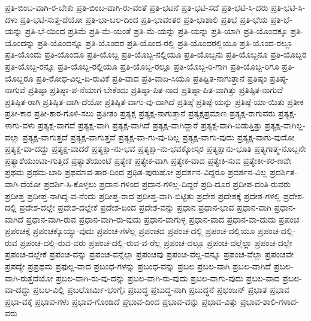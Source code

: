 {ಪ್ರತಿ-ಬಿಂಬ-ವಾಗಿ-ರ-ಬೇಕು
ಪ್ರತಿ-ಬಿಂಬ-ವಾಗಿ-ರು-ವಂತೆ
ಪ್ರತಿ-ಭಟನೆ
ಪ್ರತಿ-ಭಟಿ-ಸದೆ
ಪ್ರತಿ-ಭಟಿ-ಸಿ-ದರು
ಪ್ರತಿ-ಭಟಿ-ಸಿ-ದಳು
ಪ್ರತಿ-ಭಟಿ-ಸುತ್ತ-ದೆಯೋ
ಪ್ರತಿ-ಭಾ-ಬಲ-ದಿಂದ
ಪ್ರತಿ-ಭಾವಂತರ
ಪ್ರತಿ-ಭಾಶಾಲಿ
ಪ್ರತಿಭೆ
ಪ್ರತಿ-ಭೆಯ
ಪ್ರತಿ-ಭೆ-ಯನ್ನು
ಪ್ರತಿ-ಭೆ-ಯಿಂದ
ಪ್ರತಿಮೆ
ಪ್ರತಿ-ಮೆ-ಯಂತೆ
ಪ್ರತಿ-ಮೆ-ಯನ್ನು
ಪ್ರತಿ-ಯನ್ನು
ಪ್ರತಿ-ಯಾಗಿ
ಪ್ರತಿ-ಯೊಂದಕ್ಕೂ
ಪ್ರತಿ-ಯೊಂದನ್ನು
ಪ್ರತಿ-ಯೊಂದನ್ನೂ
ಪ್ರತಿ-ಯೊಂದರ
ಪ್ರತಿ-ಯೊಂದ-ರಲ್ಲಿ
ಪ್ರತಿ-ಯೊಂದರಲ್ಲಿಯೂ
ಪ್ರತಿ-ಯೊಂದ-ರಲ್ಲೂ
ಪ್ರತಿ-ಯೊಂದು
ಪ್ರತಿ-ಯೊಂದೂ
ಪ್ರತಿ-ಯೊಬ್ಬ
ಪ್ರತಿ-ಯೊಬ್ಬ-ನಲ್ಲಿಯೂ
ಪ್ರತಿ-ಯೊಬ್ಬನು
ಪ್ರತಿ-ಯೊಬ್ಬನೂ
ಪ್ರತಿ-ಯೊಬ್ಬರ
ಪ್ರತಿ-ಯೊಬ್ಬ-ರನ್ನೂ
ಪ್ರತಿ-ಯೊಬ್ಬ-ರಲ್ಲಿಯೂ
ಪ್ರತಿ-ಯೊಬ್ಬ-ರಲ್ಲೂ
ಪ್ರತಿ-ಯೊಬ್ಬ-ರಿ-ಗಾಗಿ
ಪ್ರತಿ-ಯೊಬ್ಬ-ರಿಗೂ
ಪ್ರತಿ-ಯೊಬ್ಬರೂ
ಪ್ರತಿ-ರೋಧ-ವಿಲ್ಲ-ದಿ-ರುವಿಕೆ
ಪ್ರತಿ-ವಾದ
ಪ್ರತಿ-ವಾದಿ-ಸಿಯೂ
ಪ್ರತಿಷ್ಟಿತ-ನಾಗುತ್ತಾನೆ
ಪ್ರತಿಷ್ಠಂ
ಪ್ರತಿಷ್ಠ-ನಾಗುವೆ
ಪ್ರತಿಷ್ಠಾ
ಪ್ರತಿಷ್ಠಾ-ಪ-ನೆಯಾಗ-ಬೇಕೆಂದು
ಪ್ರತಿಷ್ಠಾ-ಪಿತ-ನಾದ
ಪ್ರತಿಷ್ಠಾ-ಪಿತ-ವಾಗಿತ್ತು
ಪ್ರತಿಷ್ಠಿತ-ನಾಗುವೆ
ಪ್ರತಿಷ್ಠಿತ-ರಾಗಿ
ಪ್ರತಿಷ್ಠಿತ-ವಾಗಿ-ದೆಯೋ
ಪ್ರತಿಷ್ಠಿತ-ವಾಗು-ವು-ದಾಗಿದೆ
ಪ್ರತಿಷ್ಠೆ
ಪ್ರತಿಷ್ಠೆ-ಯನ್ನು
ಪ್ರತಿಷ್ಠೆ-ಯಾ-ಯಿತು
ಪ್ರತೀಕ
ಪ್ರತೀ-ಕಾರ
ಪ್ರತೀ-ಕಾರ-ಗೊಳಿ-ಸಲು
ಪ್ರತೀತಂ
ಪ್ರತ್ಯಕ್ಷ
ಪ್ರತ್ಯಕ್ಷ-ನಾಗುತ್ತಾನೆ
ಪ್ರತ್ಯಕ್ಷಪ್ರಮಾಣ
ಪ್ರತ್ಯಕ್ಷ-ರಾಗುವರು
ಪ್ರತ್ಯಕ್ಷ-ಳಾಗು-ವಳು
ಪ್ರತ್ಯಕ್ಷ-ವಾಗದೆ
ಪ್ರತ್ಯಕ್ಷ-ವಾಗಿ
ಪ್ರತ್ಯಕ್ಷ-ವಾಗಿದೆ
ಪ್ರತ್ಯಕ್ಷ-ವಾಗಿದ್ದಾರೆ
ಪ್ರತ್ಯಕ್ಷ-ವಾಗಿ-ಬಿಡುತ್ತಿತ್ತು
ಪ್ರತ್ಯಕ್ಷ-ವಾಗಿಲ್ಲ-ವಲ್ಲಾ
ಪ್ರತ್ಯಕ್ಷ-ವಾಗುತ್ತದೆ
ಪ್ರತ್ಯಕ್ಷ-ವಾಗುತ್ತವೆ
ಪ್ರತ್ಯಕ್ಷ-ವಾ-ಗು-ವು-ದಿಲ್ಲ
ಪ್ರತ್ಯಕ್ಷ-ವಾಗು-ವುದು
ಪ್ರತ್ಯಕ್ಷ-ವಾಗು-ವುದೋ
ಪ್ರತ್ಯಕ್ಷ-ವಾ-ದದ್ದು
ಪ್ರತ್ಯಕ್ಷ-ವಾದರೆ
ಪ್ರತ್ಯಕ್ಷಾ-ನು-ಭವ
ಪ್ರತ್ಯಕ್ಷಾ-ನು-ಭವಕ್ಕೋಸ್ಕರ
ಪ್ರತ್ಯಕ್ಷಾನು-ಭೂತಿ
ಪ್ರತ್ಯಗಾತ್ಮ-ನೊಬ್ಬನೇ
ಪ್ರತ್ಯಾಶೆಯುಂಟಾ-ಗುತ್ತಿದೆ
ಪ್ರತ್ಯಾಶೆಯುಂಟೆ
ಪ್ರತ್ಯೇಕ
ಪ್ರತ್ಯೇಕ-ವಾಗಿ
ಪ್ರತ್ಯೇಕ-ವಾದ
ಪ್ರತ್ಯೇಕಿ-ಸುವ
ಪ್ರತ್ಯೇಕೀ-ಕರ-ಣವೇ
ಪ್ರಥಮ
ಪ್ರಥಮ-ಬಾರಿ
ಪ್ರಥಮಾವ-ತಾರ-ದಿಂದ
ಪ್ರಥಿತ-ಪುರುಷೋ
ಪ್ರದರ್ಶನ-ವಿದ್ದರೂ
ಪ್ರದರ್ಶನ-ವಿಲ್ಲ
ಪ್ರದರ್ಶಿತ-ವಾಗಿ-ದೆಯೋ
ಪ್ರದರ್ಶಿ-ಸಿ-ಕೊಳ್ಳಲು
ಪ್ರದಾನ-ಗಳಿಂದ
ಪ್ರದಾನ-ಗಳಿಲ್ಲ-ದಿದ್ದರೆ
ಪ್ರದಿ-ದೂರ
ಪ್ರದೀಪ-ದಂತಿ-ರುವರು
ಪ್ರದೀಪ್ತ
ಪ್ರದೀಪ್ತ-ನಾಗಿದ್ದ-ವ-ನೆಂದು
ಪ್ರದೀಪ್ತ-ರಾದ
ಪ್ರದೀಪ್ತ-ವಾಗಿ-ಬಿಟ್ಟಿತು
ಪ್ರದೇಶ
ಪ್ರದೇಶಕ್ಕೆ
ಪ್ರದೇಶ-ಗಳಲ್ಲಿ
ಪ್ರದೇಶ-ದಲ್ಲಿ
ಪ್ರದೇಶ-ದಲ್ಲೇ
ಪ್ರದೇಶ-ದಲ್ಲೇಕೆ
ಪ್ರದೇಶ-ದಿಂದ
ಪ್ರದೇಶ-ವನ್ನು
ಪ್ರಧಾನ
ಪ್ರಧಾನ-ಭಾವ
ಪ್ರಧಾನ-ವಾಗಿ
ಪ್ರಧಾನ-ವಾಗಿದೆ
ಪ್ರಧಾನ-ವಾಗಿ-ರುವ
ಪ್ರಧಾನ-ವಾಗಿ-ರು-ವುದು
ಪ್ರಧಾನ-ವಾಗುಳ್ಳ
ಪ್ರಧಾನ-ವಾದ
ಪ್ರಧಾನ-ವಾ-ದುದು
ಪ್ರಪಂಚ
ಪ್ರಪಂಚಕ್ಕೆ
ಪ್ರಪಂಚಕ್ಕೊಯ್ಯು-ವುದು
ಪ್ರಪಂಚ-ಗಳೆಲ್ಲ
ಪ್ರಪಂಚದ
ಪ್ರಪಂಚ-ದಲ್ಲಿ
ಪ್ರಪಂಚ-ದಲ್ಲಿಯೂ
ಪ್ರಪಂಚ-ದಲ್ಲಿ-ರುವ
ಪ್ರಪಂಚ-ದಲ್ಲಿ-ರುವ-ವರು
ಪ್ರಪಂಚ-ದಲ್ಲಿ-ರುವ-ವ-ರೆಲ್ಲ
ಪ್ರಪಂಚ-ದಲ್ಲೂ
ಪ್ರಪಂಚ-ದಲ್ಲೆಲ್ಲಾ
ಪ್ರಪಂಚ-ದಲ್ಲೇ
ಪ್ರಪಂಚ-ದಲ್ಲೇಕೆ
ಪ್ರಪಂಚ-ವನ್ನು
ಪ್ರಪಂಚ-ವನ್ನೆಲ್ಲಾ
ಪ್ರಪಂಚವು
ಪ್ರಪಂಚ-ವೆಲ್ಲ-ವನ್ನೂ
ಪ್ರಪಂಚ-ವೆಲ್ಲಾ
ಪ್ರಪಂಚವೇ
ಪ್ರಪದ್ಯೇ
ಪ್ರಪ್ರಥಮ
ಪ್ರಫುಲ್ಲ-ವಾದ
ಪ್ರಬಂಧ-ಗಳನ್ನು
ಪ್ರಬಂಧ-ವನ್ನು
ಪ್ರಬಲ
ಪ್ರಬಲ-ವಾಗಿ
ಪ್ರಬಲ-ವಾಗಿದೆ
ಪ್ರಬಲ-ವಾಗಿ-ರುತ್ತದೆಯೋ
ಪ್ರಬಲ-ವಾಗಿ-ರು-ವು-ದನ್ನು
ಪ್ರಬಲ-ವಾಗಿ-ರು-ವುದು
ಪ್ರಬಲ-ವಾಗು-ವುದು
ಪ್ರಬಲ-ವಾದ
ಪ್ರಬಲ-ವಾ-ದದ್ದು
ಪ್ರಬಲ-ವಿಲ್ಲಿ
ಪ್ರಬಲೋರ್ಮಿ-ಭಂಗೈಃ
ಪ್ರಬುದ್ಧ
ಪ್ರಬುದ್ಧ-ನಾಗಿ
ಪ್ರಬುದ್ಧನೆ
ಪ್ರಭಂಜನ್
ಪ್ರಭಾತ
ಪ್ರಭಾವ
ಪ್ರಭಾ-ವಕ್ಕೆ
ಪ್ರಭಾವ-ಗಳು
ಪ್ರಭಾವ-ಗೊಂಡಿದೆ
ಪ್ರಭಾವ-ದಿಂದ
ಪ್ರಭಾವ-ವನ್ನು
ಪ್ರಭಾವ-ವಿತ್ತು
ಪ್ರಭಾವ-ಶಾಲಿ-ಗಳಾದ-ವರು
}

